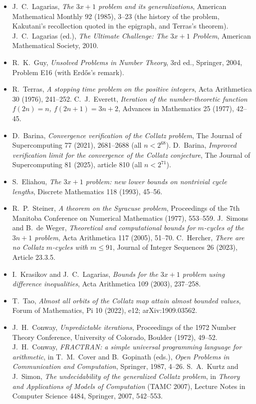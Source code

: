 \begin{itemize}
\item J.~C.~Lagarias, \emph{The $3x+1$ problem and its generalizations}, American Mathematical Monthly 92 (1985), 3--23 (the history of the problem,
Kakutani's recollection quoted in the epigraph, and Terras's theorem). J.~C.~Lagarias (ed.), \emph{The Ultimate Challenge: The $3x+1$ Problem}, American
Mathematical Society, 2010.
\item R.~K.~Guy, \emph{Unsolved Problems in Number Theory}, 3rd ed., Springer, 2004, Problem E16 (with Erd\H{o}s's remark).
\item R.~Terras, \emph{A stopping time problem on the positive integers}, Acta Arithmetica 30 (1976), 241--252. C.~J.~Everett, \emph{Iteration of the
number-theoretic function $f(2n)=n$, $f(2n+1)=3n+2$}, Advances in Mathematics 25 (1977), 42--45.
\item D.~Barina, \emph{Convergence verification of the Collatz problem}, The Journal of Supercomputing 77 (2021), 2681--2688 (all $n<2^{68}$).
D.~Barina, \emph{Improved verification limit for the convergence of the Collatz conjecture}, The Journal of Supercomputing 81 (2025), article 810
(all $n<2^{71}$).
\item S.~Eliahou, \emph{The $3x+1$ problem: new lower bounds on nontrivial cycle lengths}, Discrete Mathematics 118 (1993), 45--56.
\item R.~P.~Steiner, \emph{A theorem on the Syracuse problem}, Proceedings of the 7th Manitoba Conference on Numerical Mathematics (1977), 553--559.
J.~Simons and B.~de Weger, \emph{Theoretical and computational bounds for $m$-cycles of the $3n+1$ problem}, Acta Arithmetica 117 (2005), 51--70.
C.~Hercher, \emph{There are no Collatz $m$-cycles with $m\le91$}, Journal of Integer Sequences 26 (2023), Article 23.3.5.
\item I.~Krasikov and J.~C.~Lagarias, \emph{Bounds for the $3x+1$ problem using difference inequalities}, Acta Arithmetica 109 (2003), 237--258.
\item T.~Tao, \emph{Almost all orbits of the Collatz map attain almost bounded values}, Forum of Mathematics, Pi 10 (2022), e12; arXiv:1909.03562.
\item J.~H.~Conway, \emph{Unpredictable iterations}, Proceedings of the 1972 Number Theory Conference, University of Colorado, Boulder (1972), 49--52.
J.~H.~Conway, \emph{FRACTRAN: a simple universal programming language for arithmetic}, in T.~M.~Cover and B.~Gopinath (eds.), \emph{Open Problems in
Communication and Computation}, Springer, 1987, 4--26. S.~A.~Kurtz and J.~Simon, \emph{The undecidability of the generalized Collatz problem}, in
\emph{Theory and Applications of Models of Computation} (TAMC 2007), Lecture Notes in Computer Science 4484, Springer, 2007, 542--553.
\end{itemize}

